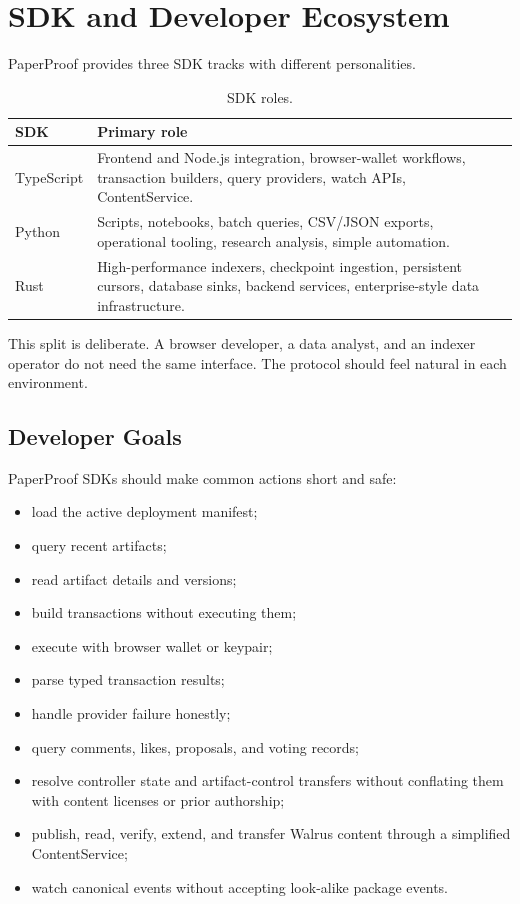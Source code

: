 \documentclass[11pt]{article}
\begin{document}
\section{SDK and Developer Ecosystem}

PaperProof provides three SDK tracks with different personalities.

\begin{table}[htbp]
\centering
\caption{SDK roles.}
\begin{tabularx}{\textwidth}{p{}X}
\toprule
\textbf{SDK} & \textbf{Primary role} \\
\midrule
TypeScript & Frontend and Node.js integration, browser-wallet workflows, transaction builders, query providers, watch APIs, ContentService. \\
Python & Scripts, notebooks, batch queries, CSV/JSON exports, operational tooling, research analysis, simple automation. \\
Rust & High-performance indexers, checkpoint ingestion, persistent cursors, database sinks, backend services, enterprise-style data infrastructure. \\
\bottomrule
\end{tabularx}
\end{table}

This split is deliberate. A browser developer, a data analyst, and an indexer
operator do not need the same interface. The protocol should feel natural in
each environment.

\subsection{Developer Goals}

PaperProof SDKs should make common actions short and safe:

\begin{itemize}[leftmargin=*]
  \item load the active deployment manifest;
  \item query recent artifacts;
  \item read artifact details and versions;
  \item build transactions without executing them;
  \item execute with browser wallet or keypair;
  \item parse typed transaction results;
  \item handle provider failure honestly;
  \item query comments, likes, proposals, and voting records;
  \item resolve controller state and artifact-control transfers without conflating them with content licenses or prior authorship;
  \item publish, read, verify, extend, and transfer Walrus content through a simplified ContentService;
  \item watch canonical events without accepting look-alike package events.
\end{itemize}
\end{document}
